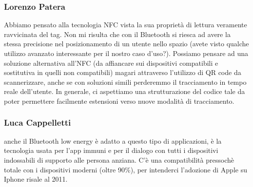 \subsubsection*{Lorenzo Patera}

Abbiamo pensato alla tecnologia NFC vista la sua proprietà di lettura veramente ravvicinata del tag. Non mi risulta che con il Bluetooth si riesca ad avere la stessa precisione nel posizionamento di un utente nello spazio (avete visto qualche utilizzo avanzato interessante per il nostro caso d'uso?). Possiamo pensare ad una soluzione alternativa all'NFC (da affiancare sui dispositivi compatibili e sostitutiva in quelli non compatibili) magari attraverso l'utilizzo di QR code da scannerizzare, anche se con soluzioni simili perderemmo il tracciamento in tempo reale dell'utente.
In generale, ci aspettiamo una strutturazione del codice tale da poter permettere facilmente estensioni verso nuove modalità di tracciamento. \\

\subsubsection*{Luca Cappelletti}

anche il Bluetooth low energy è adatto a questo tipo di applicazioni, è la tecnologia usata per l'app immuni e per il dialogo con tutti i dispositivi indossabili di supporto alle persona anziana. 
C'è una compatibilità pressochè totale con i dispositivi moderni (oltre 90\%), per intenderci l'adozione di Apple su Iphone risale al 2011.